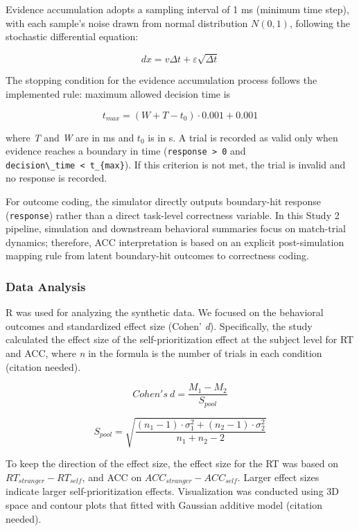 \documentclass[
  english,
  man,floatsintext]{apa6}
\begin{document}
Evidence accumulation adopts a sampling interval of 1 ms (minimum time step), with each sample's noise drawn from normal distribution \(N(0, 1)\), following the stochastic differential equation:

\[dx = v\Delta t + \varepsilon\sqrt{\Delta t}\]

The stopping condition for the evidence accumulation process follows the implemented rule: maximum allowed decision time is

\[t_{max} = (W + T - t_0) \cdot 0.001 + 0.001\]

where \emph{T} and \emph{W} are in ms and \(t_0\) is in s. A trial is recorded as valid only when evidence reaches a boundary in time (\texttt{response\ \textgreater{}\ 0} and \texttt{decision\textbackslash{}\_time\ \textless{}\ t\_\{max\}}). If this criterion is not met, the trial is invalid and no response is recorded.

For outcome coding, the simulator directly outputs boundary-hit response (\texttt{response}) rather than a direct task-level correctness variable. In this Study 2 pipeline, simulation and downstream behavioral summaries focus on match-trial dynamics; therefore, ACC interpretation is based on an explicit post-simulation mapping rule from latent boundary-hit outcomes to correctness coding.

\subsubsection{Data Analysis}\label{data-analysis-1}

R was used for analyzing the synthetic data. We focused on the behavioral outcomes and standardized effect size (Cohen' \emph{d}). Specifically, the study calculated the effect size of the self-prioritization effect at the subject level for RT and ACC, where \emph{n} in the formula is the number of trials in each condition (citation needed).

\[Cohen's\ d = \frac{M_1 - M_2}{S_{pool}}\]

\[S_{pool} = \sqrt{\frac{(n_1 - 1) \cdot \sigma_1^2 + (n_2 - 1) \cdot \sigma_2^2}{n_1 + n_2 - 2}}\]

To keep the direction of the effect size, the effect size for the RT was based on \(RT_{stranger} - RT_{self}\), and ACC on \(ACC_{stranger} - ACC_{self}\). Larger effect sizes indicate larger self-prioritization effects. Visualization was conducted using 3D space and contour plots that fitted with Gaussian additive model (citation needed).
\end{document}
